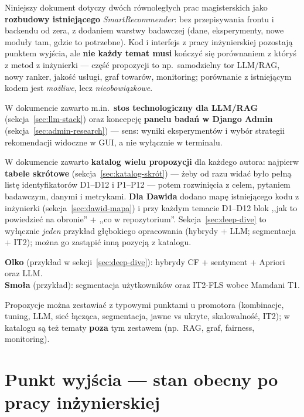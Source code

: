 \documentclass[a4paper,11pt]{article}
\begin{document}
Niniejszy dokument dotyczy dwóch równoległych prac magisterskich jako \textbf{rozbudowy istniejącego} \emph{SmartRecommender}: bez przepisywania frontu i backendu od zera, z dodaniem warstwy badawczej (dane, eksperymenty, nowe moduły tam, gdzie to potrzebne). Kod i interfejs z pracy inżynierskiej pozostają punktem wyjścia, ale \textbf{nie każdy temat musi} kończyć się porównaniem z któryś z metod z inżynierki --- część propozycji to np.\ samodzielny tor LLM/RAG, nowy ranker, jakość usługi, graf towarów, monitoring; porównanie z istniejącym kodem jest \emph{możliwe}, lecz \emph{nieobowiązkowe}.

\medskip
\noindent W dokumencie zawarto m.in.\ \textbf{stos technologiczny dla LLM/RAG} (sekcja~\ref{sec:llm-stack}) oraz koncepcję \textbf{panelu badań w Django Admin} (sekcja~\ref{sec:admin-research}) --- sens: wyniki eksperymentów i wybór strategii rekomendacji widoczne w GUI, a nie wyłącznie w terminalu.

\medskip
\noindent W dokumencie zawarto \textbf{katalog wielu propozycji} dla każdego autora: najpierw \textbf{tabele skrótowe} (sekcja~\ref{sec:katalog-skrót}) --- żeby od razu widać było pełną listę identyfikatorów D1--D12 i P1--P12 --- potem rozwinięcia z celem, pytaniem badawczym, danymi i metrykami. \textbf{Dla Dawida} dodano mapę istniejącego kodu z inżynierki (sekcja~\ref{sec:dawid-mapa}) i przy każdym temacie D1--D12 blok ,,jak to powiedzieć na obronie'' + ,,co w repozytorium''. Sekcja~\ref{sec:deep-dive} to wyłącznie \textit{jeden} przykład głębokiego opracowania (hybrydy + LLM; segmentacja + IT2); można go zastąpić inną pozycją z katalogu.

\medskip
\noindent\textbf{Olko} (przykład w sekcji~\ref{sec:deep-dive}): hybrydy CF + sentyment + Apriori oraz LLM.\\
\textbf{Smoła} (przykład): segmentacja użytkowników oraz IT2-FLS wobec Mamdani T1.

\medskip
\noindent Propozycje można zestawiać z typowymi punktami u promotora (kombinacje, tuning, LLM, sieć łącząca, segmentacja, jawne vs ukryte, skalowalność, IT2); w katalogu są też tematy \textbf{poza} tym zestawem (np.\ RAG, graf, fairness, monitoring).

\section{Punkt wyjścia --- stan obecny po pracy inżynierskiej}
\end{document}
